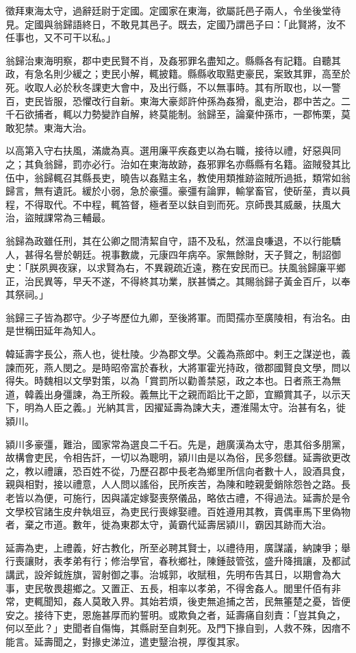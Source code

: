\begin{pinyinscope}
徵拜東海太守，過辭廷尉于定國。定國家在東海，欲屬託邑子兩人，令坐後堂待見。定國與翁歸語終日，不敢見其邑子。既去，定國乃謂邑子曰：「此賢將，汝不任事也，又不可干以私。」

翁歸治東海明察，郡中吏民賢不肖，及姦邪罪名盡知之。縣縣各有記籍。自聽其政，有急名則少緩之；吏民小解，輒披籍。縣縣收取黠吏豪民，案致其罪，高至於死。收取人必於秋冬課吏大會中，及出行縣，不以無事時。其有所取也，以一警百，吏民皆服，恐懼改行自新。東海大豪郯許仲孫為姦猾，亂吏治，郡中苦之。二千石欲捕者，輒以力勢變詐自解，終莫能制。翁歸至，論棄仲孫巿，一郡怖栗，莫敢犯禁。東海大治。

以高第入守右扶風，滿歲為真。選用廉平疾姦吏以為右職，接待以禮，好惡與同之；其負翁歸，罰亦必行。治如在東海故跡，姦邪罪名亦縣縣有名籍。盜賊發其比伍中，翁歸輒召其縣長吏，曉告以姦黠主名，教使用類推跡盜賊所過抵，類常如翁歸言，無有遺託。緩於小弱，急於豪彊。豪彊有論罪，輸掌畜官，使斫莝，責以員程，不得取代。不中程，輒笞督，極者至以鈇自剄而死。京師畏其威嚴，扶風大治，盜賊課常為三輔最。

翁歸為政雖任刑，其在公卿之間清絜自守，語不及私，然溫良嗛退，不以行能驕人，甚得名譽於朝廷。視事數歲，元康四年病卒。家無餘財，天子賢之，制詔御史：「朕夙興夜寐，以求賢為右，不異親疏近遠，務在安民而已。扶風翁歸廉平鄉正，治民異等，早夭不遂，不得終其功業，朕甚憐之。其賜翁歸子黃金百斤，以奉其祭祠。」

翁歸三子皆為郡守。少子岑歷位九卿，至後將軍。而閎孺亦至廣陵相，有治名。由是世稱田延年為知人。

韓延壽字長公，燕人也，徙杜陵。少為郡文學。父義為燕郎中。剌王之謀逆也，義諫而死，燕人閔之。是時昭帝富於春秋，大將軍霍光持政，徵郡國賢良文學，問以得失。時魏相以文學對策，以為「賞罰所以勸善禁惡，政之本也。日者燕王為無道，韓義出身彊諫，為王所殺。義無比干之親而蹈比干之節，宜顯賞其子，以示天下，明為人臣之義。」光納其言，因擢延壽為諫大夫，遷淮陽太守。治甚有名，徙潁川。

潁川多豪彊，難治，國家常為選良二千石。先是，趙廣漢為太守，患其俗多朋黨，故構會吏民，令相告訐，一切以為聰明，潁川由是以為俗，民多怨讎。延壽欲更改之，教以禮讓，恐百姓不從，乃歷召郡中長老為鄉里所信向者數十人，設酒具食，親與相對，接以禮意，人人問以謠俗，民所疾苦，為陳和睦親愛銷除怨咎之路。長老皆以為便，可施行，因與議定嫁娶喪祭儀品，略依古禮，不得過法。延壽於是令文學校官諸生皮弁執俎豆，為吏民行喪嫁娶禮。百姓遵用其教，賣偶車馬下里偽物者，棄之巿道。數年，徙為東郡太守，黃霸代延壽居潁川，霸因其跡而大治。

延壽為吏，上禮義，好古教化，所至必聘其賢士，以禮待用，廣謀議，納諫爭；舉行喪讓財，表孝弟有行；修治學官，春秋鄉社，陳鍾鼓管弦，盛升降揖讓，及都試講武，設斧鉞旌旗，習射御之事。治城郭，收賦租，先明布告其日，以期會為大事，吏民敬畏趨鄉之。又置正、五長，相率以孝弟，不得舍姦人。閭里仟佰有非常，吏輒聞知，姦人莫敢入界。其始若煩，後吏無追捕之苦，民無箠楚之憂，皆便安之。接待下吏，恩施甚厚而約誓明。或欺負之者，延壽痛自刻責：「豈其負之，何以至此？」吏聞者自傷悔，其縣尉至自刺死。及門下掾自剄，人救不殊，因瘖不能言。延壽聞之，對掾史涕泣，遣吏毉治視，厚復其家。


\end{pinyinscope}
